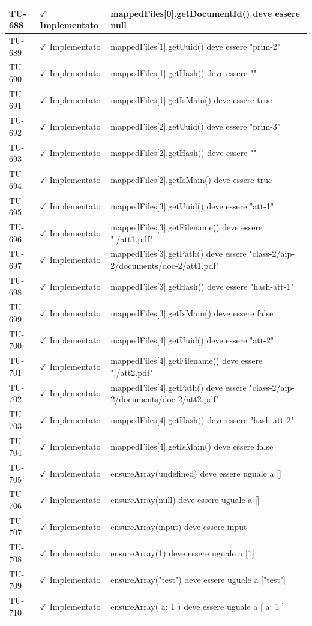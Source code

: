 ﻿\documentclass[a4paper,12pt]{article}
\newcommand{\ok}{\textcolor{green!60!black}{$\checkmark$ Implementato}}
\begin{document}
\begin{longtable}{|p{2cm}|p{3.5cm}|p{9.5cm}|}
\hline
TU-688 & \ok & mappedFiles[0].getDocumentId() deve essere null \\
\hline
TU-689 & \ok & mappedFiles[1].getUuid() deve essere "prim-2" \\
\hline
TU-690 & \ok & mappedFiles[1].getHash() deve essere "" \\
\hline
TU-691 & \ok & mappedFiles[1].getIsMain() deve essere true \\
\hline
TU-692 & \ok & mappedFiles[2].getUuid() deve essere "prim-3" \\
\hline
TU-693 & \ok & mappedFiles[2].getHash() deve essere "" \\
\hline
TU-694 & \ok & mappedFiles[2].getIsMain() deve essere true \\
\hline
TU-695 & \ok & mappedFiles[3].getUuid() deve essere "att-1" \\
\hline
TU-696 & \ok & mappedFiles[3].getFilename() deve essere "./att1.pdf" \\
\hline
TU-697 & \ok & mappedFiles[3].getPath() deve essere "class-2/aip-2/documents/doc-2/att1.pdf" \\
\hline
TU-698 & \ok & mappedFiles[3].getHash() deve essere "hash-att-1" \\
\hline
TU-699 & \ok & mappedFiles[3].getIsMain() deve essere false \\
\hline
TU-700 & \ok & mappedFiles[4].getUuid() deve essere "att-2" \\
\hline
TU-701 & \ok & mappedFiles[4].getFilename() deve essere "./att2.pdf" \\
\hline
TU-702 & \ok & mappedFiles[4].getPath() deve essere "class-2/aip-2/documents/doc-2/att2.pdf" \\
\hline
TU-703 & \ok & mappedFiles[4].getHash() deve essere "hash-att-2" \\
\hline
TU-704 & \ok & mappedFiles[4].getIsMain() deve essere false \\
\hline
TU-705 & \ok & ensureArray(undefined) deve essere uguale a [] \\
\hline
TU-706 & \ok & ensureArray(null) deve essere uguale a [] \\
\hline
TU-707 & \ok & ensureArray(input) deve essere input \\
\hline
TU-708 & \ok & ensureArray(1) deve essere uguale a [1] \\
\hline
TU-709 & \ok & ensureArray("test") deve essere uguale a ["test"] \\
\hline
TU-710 & \ok & ensureArray({ a: 1 }) deve essere uguale a [{ a: 1 }] \\

\end{longtable}
\end{document}
